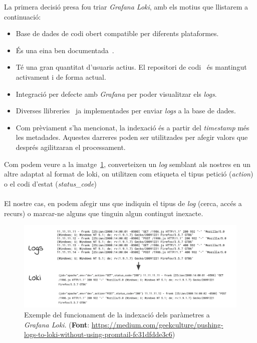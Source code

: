 \noindent
La primera decisió presa fou triar \textit{Grafana Loki}, amb els motius que llistarem a continuació:

\begin{itemize}
    \item Base de dades de codi obert compatible per diferents plataformes.
    \item És una eina ben documentada~\cite{loki:documentation}.
    \item Té una gran quantitat d’usuaris actius.
    El repositori de codi~\cite{loki:code} és mantingut activament i de forma actual.
    \item Integració per defecte amb \textit{Grafana} per poder visualitzar els \textit{logs}.
    \item Diverses llibreries~\cite{loki:libraries} ja implementades per enviar \textit{\gls{log}s} a la base de dades.
    \item Com prèviament s’ha mencionat, la indexació és a partir del \textit{\gls{timestamp}} més les metadades.
    Aquestes darreres poden ser utilitzades per afegir valors que després agilitzaran el processament.
\end{itemize}

\noindent
Com podem veure a la imatge~\ref{fig:loki-indexing}, converteixen un \textit{\gls{log}} semblant als nostres en un altre adaptat al format de loki, on utilitzen com etiqueta el tipus petició (\textit{action}) o el codi d’estat (\textit{status\_code}) \\ \\
El nostre cas, en podem afegir uns que indiquin el tipus de \textit{\gls{log}} (cerca, accés a recurs) o marcar-ne alguns que tinguin algun contingut inexacte.


\begin{figure}[htbp]
    \centerline{\includegraphics[width=1\textwidth]{figures/loki-indexing}}
    \captionsetup{justification=centering}
    \caption[Exemple del funcionament de la indexació dels paràmetres a \textit{Grafana Loki}.]{Exemple del funcionament de la indexació dels paràmetres a \textit{Grafana Loki}. (\textbf{Font}: \url{https://medium.com/geekculture/pushing-logs-to-loki-without-using-promtail-fc31dfdde3c6})}\label{fig:loki-indexing}
\end{figure}


